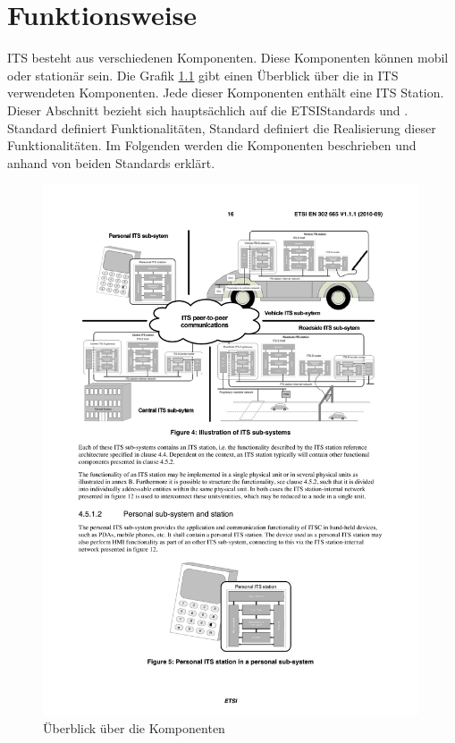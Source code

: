 \chapter{Funktionsweise \label{chap_funktionsweise}}
\ac{ITS} besteht aus verschiedenen Komponenten. Diese Komponenten können mobil oder stationär sein. Die Grafik \ref{fig:funktionsweise_komponentenueberblick} gibt einen Überblick über die in \ac{ITS} verwendeten Komponenten. Jede dieser Komponenten enthält eine \ac{ITS} Station. Dieser Abschnitt bezieht sich hauptsächlich auf die ETSIStandards \cite{etsi2010302} und \cite{etsi302636-3}. Standard \cite{etsi2010302} definiert Funktionalitäten, Standard  \cite{etsi302636-3} definiert die Realisierung dieser Funktionalitäten. Im Folgenden werden die Komponenten beschrieben und anhand von beiden Standards erklärt.


\begin{figure}
	\includegraphics[width=0.99\textwidth]{content/images/01_funktionsweise/ueberblick-ITS-subsystems.pdf}
	\caption{Überblick über die Komponenten \cite{etsi2010302}}
	\label{fig:funktionsweise_komponentenueberblick}
\end{figure}


